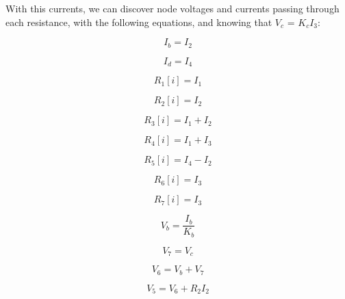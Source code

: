 \noindent With this currents, we can discover node voltages and currents passing through each resistance, with the following equations, and knowing that $V_c$ = $K_c$$I_3$:

\begin{equation}
I_ b = I_2
  \label{eq: IB}
\end{equation}

\begin{equation}
I_ d = I_4
  \label{eq: I4}
\end{equation}

\begin{equation}
R_1[i] = I_1
  \label{eq: IR1}
\end{equation}

\begin{equation}
R_2[i] = I_2
  \label{eq: IR2}
\end{equation}

\begin{equation}
R_3[i] = I_1 + I_2
  \label{eq: IR3}
\end{equation}

\begin{equation}
R_4[i] = I_1 + I_3
  \label{eq: IR4}
\end{equation}

\begin{equation}
R_5[i] = I_4 - I_2
  \label{eq: IR5}
\end{equation}

\begin{equation}
R_6[i] = I_3
  \label{eq: IR6}
\end{equation}

\begin{equation}
R_7[i] = I_3
  \label{eq: IR7}
\end{equation}

\begin{equation}
V_b = \frac{I_b}{K_b}
  \label{eq: Vb}
\end{equation}

\begin{equation}
V_7 = V_c
  \label{eq: V7}
\end{equation}

\begin{equation}
V_6 = V_b + V_7
\label{eq: V6}
\end{equation}

\begin{equation}
V_5 = V_6 + R_2I_2
  \label{eq: V5}
\end{equation}


